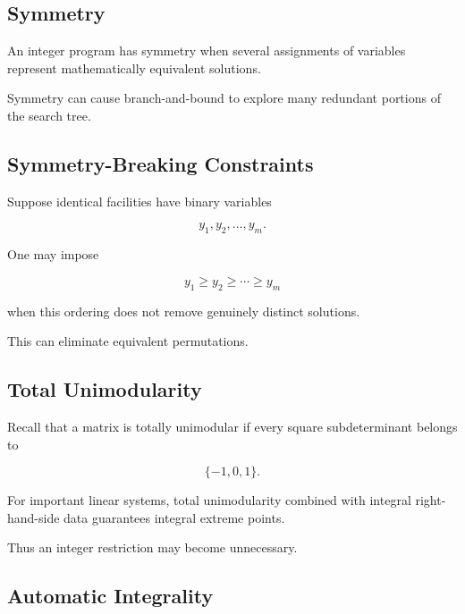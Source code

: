 \subsection{Symmetry}
\label{subsec:integer-symmetry}

An integer program has symmetry when several assignments of variables
represent mathematically equivalent solutions.

Symmetry can cause branch-and-bound to explore many redundant portions of
the search tree.

\subsection{Symmetry-Breaking Constraints}
\label{subsec:symmetry-breaking}

Suppose identical facilities have binary variables

\[
y_1,y_2,\ldots,y_m.
\]

One may impose

\[
\boxed{
y_1\geq y_2\geq\cdots\geq y_m
}
\]

when this ordering does not remove genuinely distinct solutions.

This can eliminate equivalent permutations.

\subsection{Total Unimodularity}
\label{subsec:integer-total-unimodularity}

Recall that a matrix is totally unimodular if every square subdeterminant
belongs to

\[
\boxed{
\{-1,0,1\}.
}
\]

For important linear systems, total unimodularity combined with integral
right-hand-side data guarantees integral extreme points.

Thus an integer restriction may become unnecessary.

\subsection{Automatic Integrality}
\label{subsec:automatic-integrality}

